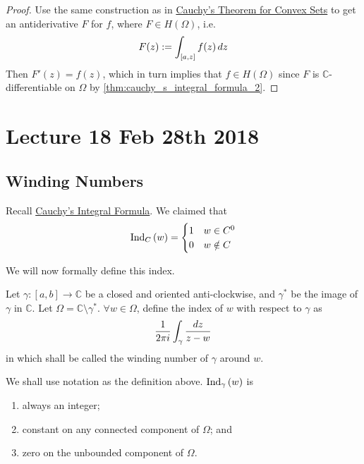\documentclass[notoc,notitlepage]{tufte-book}
\begin{document}
\begin{proof}
	Use the same construction as in \hyperref[thm:cauchy_s_theorem_for_convex_set]{Cauchy's Theorem for Convex Sets} to get an antiderivative $F$ for $f$, where $F \in H(\Omega)$, i.e.
	\begin{equation*}
		F(z) := \int_{[a, z]} f(z) \dif{z}
	\end{equation*}
	Then $F'(z) = f(z)$, which in turn implies that $f \in H(\Omega)$ since $F$ is $\mathbb{C}$-differentiable on $\Omega$ by \cref{thm:cauchy_s_integral_formula_2}.
\end{proof}



\chapter{Lecture 18 Feb 28th 2018}
	\label{chapter:lecture_18_feb_28th_2018}

\section{Winding Numbers} %
\label{sec:winding_numbers}

Recall \hyperref[thm:cauchy_s_integral_formula_1]{Cauchy's Integral Formula}. We claimed that
\begin{equation*}
	\ind{w}{C} = \begin{cases}
		1	& w \in C^0 \\
		0	& w \notin C
	\end{cases}
\end{equation*}

We will now formally define this index.

\begin{defn}\label{defn:winding_numbers}
	Let $\gamma : [a, b] \to \mathbb{C}$ be a closed and oriented anti-clockwise, and $\gamma^*$ be the image of $\gamma$ in $\mathbb{C}$. Let $\Omega = \mathbb{C} \setminus \gamma^*$. $\forall w \in \Omega$, define the index of $w$ with respect to $\gamma$ as
	\begin{equation*}
		\frac{1}{2 \pi i} \int_{\gamma} \frac{\dif{z}}{z - w} 
	\end{equation*}
	in which shall be called the winding number of $\gamma$ around $w$.
\end{defn}

\begin{thm}\label{thm:winding_number_theorem}
	We shall use notation as the definition above. $\ind{w}{\gamma}$ is
	\begin{enumerate}
		\item always an integer;
		\item constant on any connected component of $\Omega$; and
		\item zero on the unbounded component of $\Omega$.
	\end{enumerate}
\end{thm}
\end{document}
